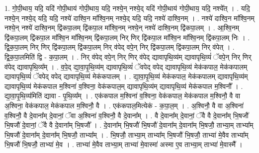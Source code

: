 \documentclass[17pt]{extarticle}
\begin{document}
1. गो॒पी॒थाय॒ यदि॒ यदि॑ गोपी॒थाय॑ गोपी॒थाय॒ यदि॒ नश्ये॒न् नश्ये॒द् यदि॑ गोपी॒थाय॑ गोपी॒थाय॒ यदि॒ नश्ये᳚त् । . यदि॒ नश्ये॒न् नश्ये॒द् यदि॒ यदि॒ नश्ये॑ दाश्वि॒न मा᳚श्वि॒नम् नश्ये॒द् यदि॒ यदि॒ नश्ये॑ दाश्वि॒नम् । . नश्ये॑ दाश्वि॒न मा᳚श्वि॒नम् नश्ये॒न् नश्ये॑ दाश्वि॒नम् द्वि॑कपा॒लम् द्वि॑कपा॒ल मा᳚श्वि॒नम् नश्ये॒न् नश्ये॑ दाश्वि॒नम् द्वि॑कपा॒लम् । . आ॒श्वि॒नम् द्वि॑कपा॒लम् द्वि॑कपा॒ल मा᳚श्वि॒न मा᳚श्वि॒नम् द्वि॑कपा॒लम् निर् णिर् द्वि॑कपा॒ल मा᳚श्वि॒न मा᳚श्वि॒नम् द्वि॑कपा॒लम् निः । . द्वि॒क॒पा॒लम् निर् णिर् द्वि॑कपा॒लम् द्वि॑कपा॒लम् निर् व॑पेद् वपे॒न् निर् द्वि॑कपा॒लम् द्वि॑कपा॒लम् निर् व॑पेत् । . द्वि॒क॒पा॒लमिति॑ द्वि - क॒पा॒लम् । . निर् व॑पेद् वपे॒न् निर् णिर् व॑पेद् द्यावापृथि॒व्य॑म् द्यावापृथि॒व्यं॑ ॅवपे॒न् निर् णिर् व॑पेद् द्यावापृथि॒व्य᳚म् । . व॒पे॒द् द्या॒वा॒पृ॒थि॒व्य॑म् द्यावापृथि॒व्यं॑ ॅवपेद् वपेद् द्यावापृथि॒व्य॑ 
मेक॑कपाल॒ मेक॑कपालम् द्यावापृथि॒व्यं॑ ॅवपेद् वपेद् द्यावापृथि॒व्य॑ मेक॑कपालम् । . द्या॒वा॒पृ॒थि॒व्य॑ मेक॑कपाल॒ मेक॑कपालम् द्यावापृथि॒व्य॑म् द्यावापृथि॒व्य॑ मेक॑कपाल म॒श्विना॑ व॒श्विना॒ वेक॑कपाल॒म् द्यावापृथि॒व्य॑म् द्यावापृथि॒व्य॑ मेक॑कपाल म॒श्विनौ᳚ । . द्या॒वा॒पृ॒थि॒व्य॑मिति॑ द्यावा - पृ॒थि॒व्य᳚म् । . एक॑कपाल म॒श्विना॑ व॒श्विना॒ वेक॑कपाल॒ मेक॑कपाल म॒श्विनौ॒ वै वा अ॒श्विना॒ वेक॑कपाल॒ मेक॑कपाल म॒श्विनौ॒ वै । . एक॑कपाल॒मित्येक॑ - क॒पा॒ल॒म् । . अ॒श्विनौ॒ वै वा अ॒श्विना॑ व॒श्विनौ॒ वै दे॒वाना᳚म् दे॒वानां॒ ॅवा अ॒श्विना॑ व॒श्विनौ॒ वै दे॒वाना᳚म् । . वै दे॒वाना᳚म् दे॒वानां॒ ॅवै वै दे॒वाना᳚म् भि॒षजौ॑ भि॒षजौ॑ दे॒वानां॒ ॅवै वै दे॒वाना᳚म् भि॒षजौ᳚ । . दे॒वाना᳚म् भि॒षजौ॑ भि॒षजौ॑ दे॒वाना᳚म् दे॒वाना᳚म् भि॒षजौ॒ ताभ्या॒म् ताभ्या᳚म् भि॒षजौ॑ दे॒वाना᳚म् दे॒वाना᳚म् भि॒षजौ॒ ताभ्या᳚म् । . भि॒षजौ॒ ताभ्या॒म् ताभ्या᳚म् भि॒षजौ॑ भि॒षजौ॒ ताभ्या॑ मे॒वैव ताभ्या᳚म् भि॒षजौ॑ भि॒षजौ॒ ताभ्या॑ मे॒व । . ताभ्या॑ मे॒वैव ताभ्या॒म् ताभ्या॑ मे॒वास्मा॑ अस्मा ए॒व ताभ्या॒म् ताभ्या॑ मे॒वास्मै᳚ । \newline
\end{document}
